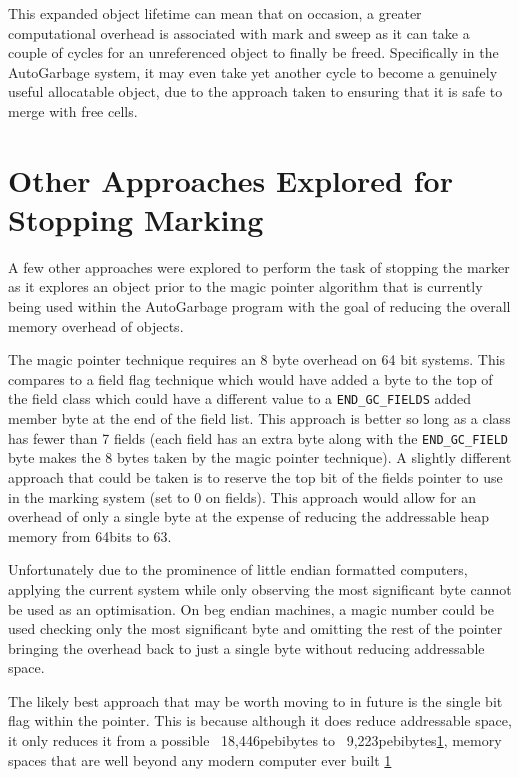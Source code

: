 \documentclass[11pt]{article}
\begin{document}
This expanded object lifetime can mean that on occasion, a greater computational overhead is associated with
mark and sweep as it can take a couple of cycles for an unreferenced object to finally be freed. Specifically in the AutoGarbage
system, it may even take yet another cycle to become a genuinely useful allocatable object, due to the approach taken to ensuring
that it is safe to merge with free cells.

\newpage
\appendix
\section{Other Approaches Explored for Stopping Marking}
A few other approaches were explored to perform the task of stopping the marker as it explores an object prior to the magic
pointer algorithm that is currently being used within the AutoGarbage program with the goal of reducing the overall memory overhead
of objects. 

The magic pointer technique requires an 8 byte overhead on 64 bit systems. This compares to a field flag technique which would
have added a byte to the top of the field class which could have a different value to a \texttt{END\_GC\_FIELDS} added member byte 
at the end of the field list. This approach is better so long as a class has fewer than 7 fields (each field has an extra byte 
along with the \texttt{END\_GC\_FIELD} byte makes the 8 bytes taken by the magic pointer technique).
A slightly different approach that could be taken is to reserve the top bit of the fields pointer to use in the marking system
(set to 0 on fields). This approach would allow for an overhead of only a single byte at the expense of reducing the addressable 
heap memory from 64bits to 63.

Unfortunately due to the prominence of little endian formatted computers, applying the current system while only observing the most
significant byte cannot be used as an optimisation. On beg endian machines, a magic number could be used checking only the most
significant byte and omitting the rest of the pointer bringing the overhead back to just a single byte without reducing
addressable space.

The likely best approach that may be worth moving to in future is the single bit flag within the pointer. This is because although
it does reduce addressable space, it only reduces it from a possible ~18,446pebibytes to ~9,223pebibytes\ref{}, memory spaces that
are well beyond any modern computer ever built \ref{}
\end{document}
